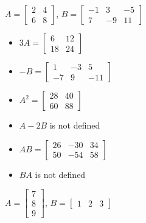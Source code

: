 \documentclass{ximera}
\begin{document}
\begin{question}
\begin{problem}
\begin{solution}
\begin{itemize}
\end{itemize}
\end{solution}
\end{problem}

\begin{problem}
$A = \left[ \begin{array}{rr} 2 & 4 \\ 6 & 8 \end{array} \right]$, $B=\left[ \begin{array}{rrr} -1 & 3 & -5 \\ 7 & -9 & 11 \end{array} \right]$

\begin{solution}
\begin{itemize}
\item  $3A = \left[ \begin{array}{rr} 6 & 12 \\ 18 & 24 \end{array} \right]$

\item $-B = \left[ \begin{array}{rrr} 1 & -3 & 5 \\ -7 & 9 & -11 \end{array} \right]$

\item $A^2 = \left[ \begin{array}{rr} 28 & 40 \\ 60 & 88 \end{array} \right]$

\item  $A-2B$ is not defined

\item $AB = \left[ \begin{array}{rrr} 26 & -30 & 34 \\ 50 & -54 & 58 \end{array} \right]$

\item $BA$ is not defined

\end{itemize}
\end{solution}
\end{problem}

\begin{problem}
$A = \left[ \begin{array}{r} 7 \\ 8 \\ 9 \end{array} \right]$, $B=\left[ \begin{array}{rrr} 1 & 2 & 3 \end{array} \right]$


\end{problem}
\end{question}
\end{document}
